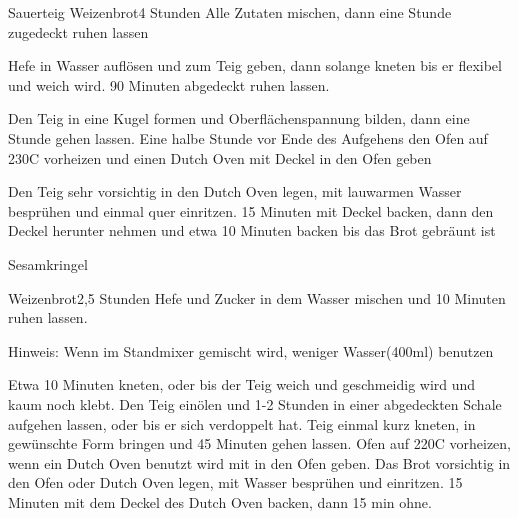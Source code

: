 \begin{recipe}{Sauerteig Weizenbrot}{}{4 Stunden}
Alle Zutaten mischen, dann eine Stunde zugedeckt ruhen lassen

Hefe in Wasser auflösen und zum Teig geben, dann solange kneten bis er flexibel und weich wird.
90 Minuten abgedeckt ruhen lassen.

\ing[]{}{}
Den Teig in eine Kugel formen und Oberflächenspannung bilden, dann eine Stunde gehen lassen.
Eine halbe Stunde vor Ende des Aufgehens den Ofen auf 230\0C vorheizen und einen Dutch Oven mit Deckel in den Ofen geben

\ing[]{}{}
Den Teig sehr vorsichtig in den Dutch Oven legen, mit lauwarmen Wasser besprühen und einmal quer einritzen. 15 Minuten mit Deckel backen, dann den Deckel herunter nehmen und etwa 10 Minuten backen bis das Brot gebräunt ist
\end{recipe}


\begin{recipe}{Sesamkringel}{}{}

\end{recipe}


\begin{recipe}{Weizenbrot}{}{2,5 Stunden}
Hefe und Zucker in dem Wasser mischen und 10 Minuten ruhen lassen.

Hinweis: Wenn im Standmixer gemischt wird, weniger Wasser(400ml) benutzen

Etwa 10 Minuten kneten, oder bis der Teig weich und geschmeidig wird und kaum noch klebt.
Den Teig einölen und 1-2 Stunden in einer abgedeckten Schale aufgehen lassen, oder bis er sich verdoppelt hat.
Teig einmal kurz kneten, in gewünschte Form bringen und 45 Minuten gehen lassen.
Ofen auf 220\0C vorheizen, wenn ein Dutch Oven benutzt wird mit in den Ofen geben.
Das Brot vorsichtig in den Ofen oder Dutch Oven legen, mit Wasser besprühen und einritzen.
15 Minuten mit dem Deckel des Dutch Oven backen, dann 15 min ohne.
\end{recipe}

